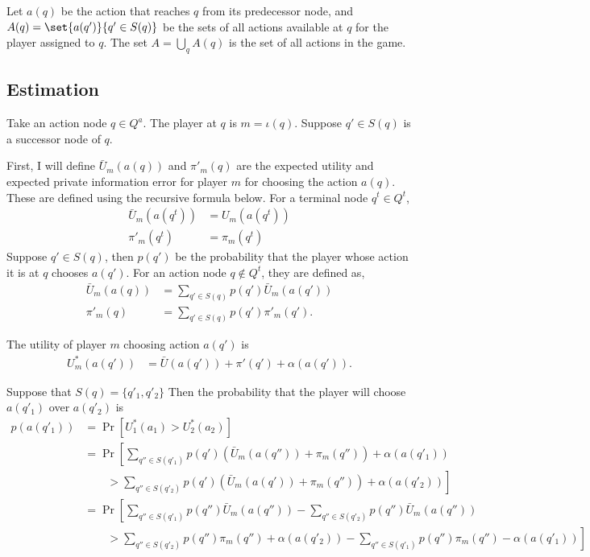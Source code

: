 \documentclass{article}
\begin{document}
Let $a(q)$ be the action that reaches $q$ from its predecessor node, and $A(q) = \set{a(q')}{q' \in S(q)}$ be the sets of all actions available at $q$ for the player assigned to $q$. 
The set $A = \bigcup_{q} A(q)$ is the set of all actions in the game.

\subsection{Estimation}

Take an action node $q \in Q^{a}$.
The player at $q$ is $m = \iota(q)$.
Suppose $q' \in S(q)$ is a successor node of $q$.

First, I will define $\bar{U}_{m}(a(q))$ and $\pi'_{m}(q)$ are the expected utility and expected private information error for player $m$ for choosing the action $a(q)$. 
These are defined using the recursive formula below.
For a terminal node $q^{t} \in Q^{t}$, 
\begin{align*}
  \bar{U}_{m}(a(q^{t})) &= U_{m}(a(q^{t})) \\
  \pi'_{m}(q^{t}) &= \pi_{m}(q^{t}) 
\end{align*}
Suppose $q' \in S(q)$, then $p(q')$ be the probability that the player whose action it is at $q$ chooses $a(q')$.
For an action node $q \notin Q^{t}$, they are defined as,
\begin{align*}
  \bar{U}_m(a(q)) &= \sum_{q' \in S(q)} p(q') \bar{U}_{m}(a(q')) \\
  \pi'_m(q) &= \sum_{q' \in S(q)} p(q') \pi'_{m}(q').
\end{align*}

The utility of player $m$ choosing action $a(q')$ is 
\begin{align*}
  U^{*}_{m}(a(q')) &= \bar{U}(a(q')) + \pi'(q') + \alpha(a(q')).
\end{align*}

Suppose that $S(q) = \{q'_{1}, q'_{2} \}$
Then the probability that the player will choose $a(q'_{1})$ over $a(q'_{2})$ is
\begin{align*}
  p(a(q'_{1})) &= \Pr[ U^{*}_{1}(a_{1}) > U^{*}_{2}(a_{2}) ] \\
  &=
    \Pr \left[
      \sum_{q'' \in S(q'_{1})} p(q') ( \bar{U}_{m}(a(q'')) + \pi_{m}(q'')) + \alpha(a(q'_{1})) 
    \right. \\
  &  \left.
      \qquad  > \sum_{q'' \in S(q'_{2})} p(q') (\bar{U}_{m}(a(q')) + \pi_{m}(q'')) + \alpha(a(q'_{2})) 
    \right] \\
  & = \Pr
  \left[
    \sum_{q'' \in S(q'_{1})} p(q'') \bar{U}_{m}(a(q'')) - \sum_{q'' \in S(q'_{2})} p(q'') \bar{U}_{m}(a(q'')) \right. \\
  & \qquad > 
  \left. 
    \sum_{q'' \in S(q'_{2})} p(q'') \pi_{m}(q'') + \alpha(a(q'_{2})) -  \sum_{q'' \in S(q'_{1})} p(q'') \pi_{m}(q'') - \alpha(a(q'_{1})) 
  \right]
\end{align*}
\end{document}
